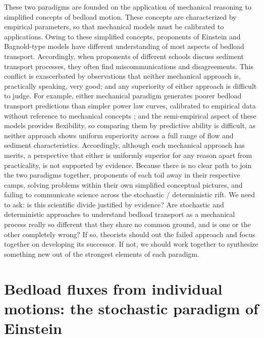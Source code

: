 \documentclass{article}
\begin{document}
These two paradigms are founded on the application of mechanical reasoning to simplified concepts of bedload motion.
These concepts are characterized by empirical parameters, so that mechanical models must be calibrated to applications. 
Owing to these simplified concepts, proponents of Einstein and Bagnold-type models have different understanding of most aspects of bedload transport.
Accordingly, when proponents of different schools discuss sediment transport processes, they often find miscommunications and disagreements. 
This conflict is exascerbated by observations that neither mechanical approach is, practically speaking, very good; and any superiority of either approach is difficult to judge. 
For example, either mechanical paradigm generates poorer bedload transport predictions than simpler power law curves, calibrated to empirical data without reference to mechanical concepts \citep{Barry2004}; and the semi-empirical aspect of these models provides flexibility, so comparing them by predictive ability is difficult, as neither approach shows uniform superiority across a full range of flow and sediment characteristics. 
Accordingly, although each mechanical approach has merits, a perspective that either is uniformly superior for any reason apart from practicality, is not supported by evidence.  
Because there is no clear path to join the two paradigms together, proponents of each toil away in their respective camps, solving problems within their own simplified conceptual pictures, and failing to communicate science across the stochastic / deterministic rift. 
We need to ask: is this scientific divide justified by evidence? 
Are stochastic and deterministic approaches to understand bedload transport as a mechanical process really so different that they share no common ground, and is one or the other completely wrong? 
If so, theorists should out the failed approach and focus together on developing its successor. 
If not, we should work together to synthesize something new out of the strongest elements of each paradigm. 

\section{Bedload fluxes from individual motions: the stochastic paradigm of Einstein}
\end{document}
